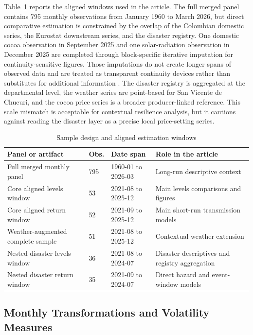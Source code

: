 \documentclass[11pt]{article}
\begin{document}
Table~\ref{tab:sample_design} reports the aligned windows used in the article. The full merged panel contains 795 monthly observations from January 1960 to March 2026, but direct comparative estimation is constrained by the overlap of the Colombian domestic series, the Eurostat downstream series, and the disaster registry. One domestic cocoa observation in September 2025 and one solar-radiation observation in December 2025 are completed through block-specific iterative imputation for continuity-sensitive figures. Those imputations do not create longer spans of observed data and are treated as transparent continuity devices rather than substitutes for additional information \citep{vanbuuren_groothuisoudshoorn_2011,troyanskaya_etal_2001}. The disaster registry is aggregated at the departmental level, the weather series are point-based for San Vicente de Chucuri, and the cocoa price series is a broader producer-linked reference. This scale mismatch is acceptable for contextual resilience analysis, but it cautions against reading the disaster layer as a precise local price-setting series.

\begin{table}[H]
\centering
\caption{Sample design and aligned estimation windows}
\label{tab:sample_design}
\small
\setlength{\tabcolsep}{4pt}
\begin{tabular}{p{5.1cm}p{1.7cm}p{3.2cm}p{4.0cm}}
\toprule
Panel or artifact & Obs. & Date span & Role in the article \\
\midrule
Full merged monthly panel & 795 & 1960-01 to 2026-03 & Long-run descriptive context \\
Core aligned levels window & 53 & 2021-08 to 2025-12 & Main levels comparisons and figures \\
Core aligned return window & 52 & 2021-09 to 2025-12 & Main short-run transmission models \\
Weather-augmented complete sample & 51 & 2021-08 to 2025-12 & Contextual weather extension \\
Nested disaster levels window & 36 & 2021-08 to 2024-07 & Disaster descriptives and registry aggregation \\
Nested disaster return window & 35 & 2021-09 to 2024-07 & Direct hazard and event-window models \\
\bottomrule
\end{tabular}
\end{table}

\subsection{Monthly Transformations and Volatility Measures}
\end{document}
